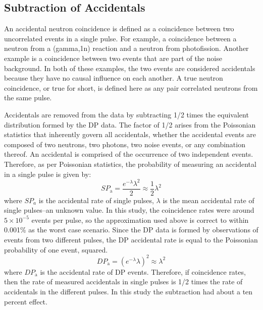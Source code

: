 \subsection{Subtraction of Accidentals}
\label{Subtraction of Accidentals}
An accidental neutron coincidence is defined as a coincidence between two uncorrelated events in a single pulse.
For example, a coincidence between a neutron from a (gamma,1n) reaction and a neutron from photofission.
Another example is a coincidence between two events that are part of the noise background.
In both of these examples, the two events are considered accidentals because they have no causal influence on each another.
A true neutron coincidence, or true for short, is defined here as any pair correlated neutrons from the same pulse.

Accidentals are removed from the data by subtracting 1/2 times the equivalent distribution formed by the DP data.
The factor of 1/2 arises from the Poissonian statistics that inherently govern all accidentals, whether the accidental events are composed of two neutrons, two photons, two noise events, or any combination thereof.
An accidental is comprised of the occurrence of two independent events.
Therefore, as per Poissonian statistics, the probability of measuring an accidental in a single pulse is given by:
\begin{displaymath}
SP_{\text{a}} = \frac{e^{-\lambda}\lambda^2}{2} \approx \frac{1}{2}\lambda^{2}
\end{displaymath}
where $SP_{a}$ is the accidental rate of single pulses, $\lambda$ is the mean accidental rate of single pulses–an unknown value.
In this study, the coincidence rates were around $5\times10^{-5}$ events per pulse, so the approximation used above is correct to within 0.001\% as the worst case scenario.
Since the DP data is formed by observations of events from two different pulses, the DP accidental rate is equal to the Poissonian probability of one event, squared.
\begin{displaymath}
DP_{\text{a}} = (e^{-\lambda}\lambda)^{2}\approx \lambda^{2} 
\end{displaymath}
where $DP_{\text{a}}$ is the accidental rate of DP events.
Therefore, if coincidence rates, then the rate of measured accidentals in single pulses is 1/2 times the rate of accidentals in the different pulses.
In this study the subtraction had about a ten percent effect.
